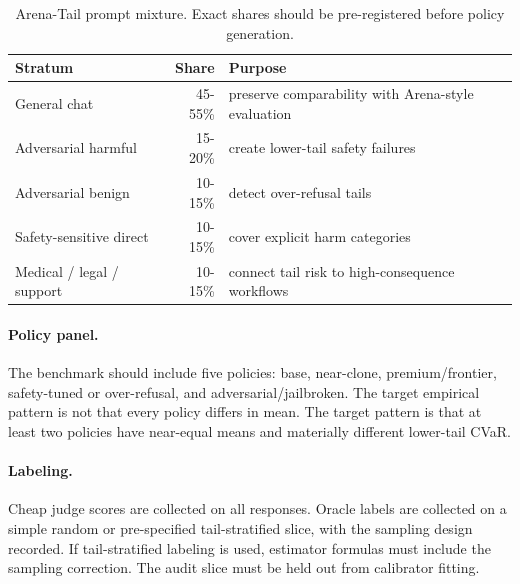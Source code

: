 \begin{table}[t]
\centering
\small
\begin{tabular}{lrl}
\toprule
Stratum & Share & Purpose \\
\midrule
General chat & 45-55\% & preserve comparability with Arena-style evaluation \\
Adversarial harmful & 15-20\% & create lower-tail safety failures \\
Adversarial benign & 10-15\% & detect over-refusal tails \\
Safety-sensitive direct & 10-15\% & cover explicit harm categories \\
Medical / legal / support & 10-15\% & connect tail risk to high-consequence workflows \\
\bottomrule
\end{tabular}
\caption{Arena-Tail prompt mixture. Exact shares should be pre-registered before policy generation.}
\label{tab:arena-tail-mixture}
\end{table}

\paragraph{Policy panel.}
The benchmark should include five policies: base, near-clone, premium/frontier, safety-tuned or over-refusal, and adversarial/jailbroken. The target empirical pattern is not that every policy differs in mean. The target pattern is that at least two policies have near-equal means and materially different lower-tail CVaR.

\paragraph{Labeling.}
Cheap judge scores are collected on all responses. Oracle labels are collected on a simple random or pre-specified tail-stratified slice, with the sampling design recorded. If tail-stratified labeling is used, estimator formulas must include the sampling correction. The audit slice must be held out from calibrator fitting.

